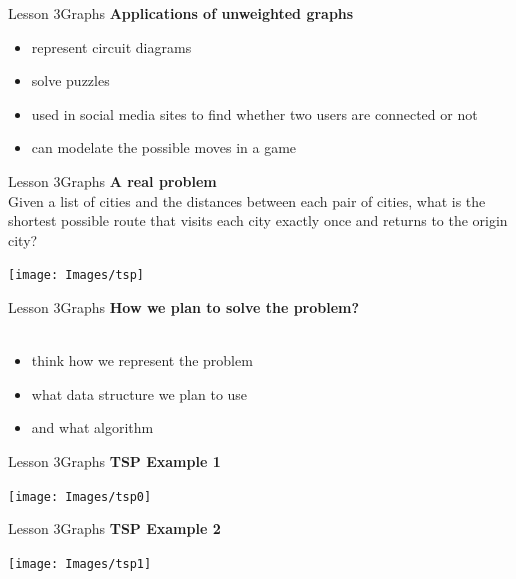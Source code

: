 \documentclass[aspectratio=1610]{beamer}
\begin{document}
\begin{frame}{Lesson 3}{Graphs}
\LARGE
\textbf{Applications of unweighted graphs}\\
\Large
\begin{itemize}
    \item represent circuit diagrams
    \item solve puzzles    
    \item used in social media sites to find whether two users are connected or not
    \item can modelate the possible moves in a game
\end{itemize}
\end{frame}


\begin{frame}{Lesson 3}{Graphs}
\LARGE
\textbf{A real problem}\\
Given a list of cities and the distances between each pair of
cities, what is the shortest possible route that visits each city
exactly once and returns to the origin city?
\begin{center}
\texttt{[image: Images/tsp]}
\end{center}
\end{frame}


\begin{frame}{Lesson 3}{Graphs}
\LARGE
\textbf{How we plan to solve the problem?}\\~\\
\begin{itemize}
    \item think how we represent the problem
    \item what data structure we plan to use
    \item and what algorithm
\end{itemize}
\end{frame}



\begin{frame}{Lesson 3}{Graphs}
\LARGE
\textbf{TSP Example 1}\\
\begin{center}
\texttt{[image: Images/tsp0]}
\end{center}
\end{frame}


\begin{frame}{Lesson 3}{Graphs}
\LARGE
\textbf{TSP Example 2}\\
\begin{center}
\texttt{[image: Images/tsp1]}
\end{center}
\end{frame}
\end{document}
